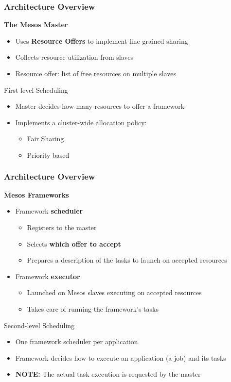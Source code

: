 \begin{frame}
\frametitle{Architecture Overview}
{\bf The Mesos Master}
\begin{itemize}
	\item Uses {\bf Resource Offers} to implement fine-grained sharing
	\item Collects resource utilization from slaves
	\item Resource offer: list of free resources on multiple slaves
\end{itemize}

\begin{block}{First-level Scheduling}
\begin{itemize}
	\item Master decides how many resources to offer a framework
	\item Implements a cluster-wide allocation policy:
	\begin{itemize}
		\item Fair Sharing
		\item Priority based
	\end{itemize}
\end{itemize}
\end{block}
\end{frame}

\begin{frame}
\frametitle{Architecture Overview}
{\bf Mesos Frameworks}
\begin{itemize}
	\item Framework {\bf scheduler}
	\begin{itemize}
		\item Registers to the master
		\item Selects {\bf which offer to accept}
		\item Prepares a description of the tasks to launch on accepted resources
	\end{itemize}	
	\item Framework {\bf executor}
	\begin{itemize}
		\item Launched on Mesos slaves executing on accepted resources
		\item Takes care of running the framework's tasks
	\end{itemize}
\end{itemize}
\begin{block}{Second-level Scheduling}
\begin{itemize}
	\item One framework scheduler per application
	\item Framework decides how to execute an application (a job) and its tasks
	\item {\bf NOTE:} The actual task execution is requested by the master
\end{itemize}
\end{block}
\end{frame}

